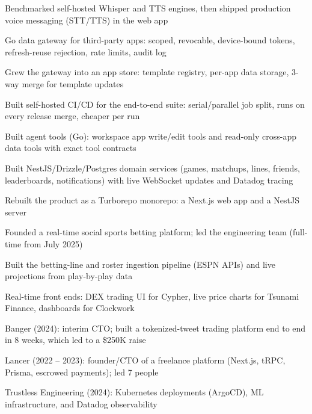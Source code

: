 \documentclass[print]{jack-resume}
\begin{document}
\begin{tightemize}
    \item Benchmarked self-hosted Whisper and TTS engines, then shipped production voice messaging (STT/TTS) in the web app
    \item Go data gateway for third-party apps: scoped, revocable, device-bound tokens, refresh-reuse rejection, rate limits, audit log
    \item Grew the gateway into an app store: template registry, per-app data storage, 3-way merge for template updates
    \item Built self-hosted CI/CD for the end-to-end suite: serial/parallel job split, runs on every release merge, cheaper per run
    \item Built agent tools (Go): workspace app write/edit tools and read-only cross-app data tools with exact tool contracts
\end{tightemize}
\sectionsep

\begin{tightemize}
    \item Built NestJS/Drizzle/Postgres domain services (games, matchups, lines, friends, leaderboards, notifications) with live WebSocket updates and Datadog tracing
    \item Rebuilt the product as a Turborepo monorepo: a Next.js web app and a NestJS server
    \item Founded a real-time social sports betting platform; led the engineering team (full-time from July 2025)
    \item Built the betting-line and roster ingestion pipeline (ESPN APIs) and live projections from play-by-play data
\end{tightemize}
\sectionsep

\begin{tightemize}
    \item Real-time front ends: DEX trading UI for Cypher, live price charts for Tsunami Finance, dashboards for Clockwork
    \item Banger (2024): interim CTO; built a tokenized-tweet trading platform end to end in 8 weeks, which led to a \$250K raise
    \item Lancer (2022 -- 2023): founder/CTO of a freelance platform (Next.js, tRPC, Prisma, escrowed payments); led 7 people
    \item Trustless Engineering (2024): Kubernetes deployments (ArgoCD), ML infrastructure, and Datadog observability
\end{tightemize}
\sectionsep
\end{document}
